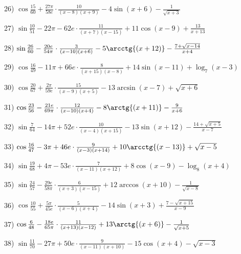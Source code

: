 \documentclass[11pt,ukrainian]{article}
\begin{document}
26) \space 
{ ${\cos\frac{15}{60}} + \frac{27{\pi}}{58 e}\cdot {\frac{10}{(x - 8)(x + 9)}} - {4\sin{(x + 6)}} - {\frac{1}{\sqrt{x + 3}}}$}
\smallskip\par
27) \space 
{ ${\sin\frac{10}{51}} - 22{\pi} - 62 e\cdot {\frac{11}{(x + 7)(x - 15)}} + {11\cos{(x - 9)}} + { \frac{13}{x + 13}}$}
\smallskip\par
28) \space 
{ ${\sin\frac{26}{60}} - \frac{20 e}{54{\pi}}\cdot {\frac{3}{(x - 10)(x + 6)}} - {5\arcctg{(x + 12)}} - {\frac{7 + \sqrt{x - 14}}{x + 4}}$}
\smallskip\par
29) \space 
{ ${\cos\frac{16}{49}} - 11{\pi} + 66 e\cdot {\frac{8}{(x + 15)(x - 8)}} + {14\sin{(x - 11)}} + {\log_{7}(x - 3)}$}
\smallskip\par
30) \space 
{ ${\cos\frac{20}{67}} + \frac{2{\pi}}{59 e}\cdot {\frac{15}{(x - 9)(x + 5)}} - {13\arcsin{(x - 7)}} + {\sqrt{x + 6}}$}
\smallskip\par
31) \space 
{ ${\cos\frac{23}{56}} - \frac{21 e}{69{\pi}}\cdot {\frac{12}{(x - 10)(x + 4)}} - {8\arctg{(x + 11)}} - { \frac{9}{x + 6}}$}
\smallskip\par
32) \space 
{ ${\sin\frac{7}{64}} - 14{\pi} + 52 e\cdot {\frac{10}{(x - 4)(x + 15)}} - {13\sin{(x + 12)}} - {\frac{14 + \sqrt{x + 5}}{x - 7}}$}
\smallskip\par
33) \space 
{ ${\cos\frac{16}{47}} - 3{\pi} + 46 e\cdot {\frac{9}{(x - 3)(x + 14)}} + {10\arcctg{(x - 13)}} + {\sqrt{x - 5}}$}
\smallskip\par
34) \space 
{ ${\sin\frac{19}{68}} + 4{\pi} - 53 e\cdot {\frac{7}{(x - 11)(x + 12)}} + {8\cos{(x - 9)}} - {\log_{8}(x + 4)}$}
\smallskip\par
35) \space 
{ ${\sin\frac{24}{57}} - \frac{29 e}{58{\pi}}\cdot {\frac{6}{(x + 3)(x - 15)}} + {12\arccos{(x + 10)}} - {\frac{1}{\sqrt{x - 8}}}$}
\smallskip\par
36) \space 
{ ${\cos\frac{10}{55}} + \frac{5{\pi}}{45 e}\cdot {\frac{5}{(x - 6)(x + 4)}} - {14\sin{(x + 3)}} + {\frac{7 - \sqrt{x + 15}}{x - 9}}$}
\smallskip\par
37) \space 
{ ${\cos\frac{6}{48}} - \frac{18 e}{65{\pi}}\cdot {\frac{11}{(x + 13)(x - 12)}} + {13\arctg{(x + 6)}} - {\frac{1}{\sqrt{x + 5}}}$}
\smallskip\par
38) \space 
{ ${\sin\frac{11}{70}} - 27{\pi} + 50 e\cdot {\frac{9}{(x - 11)(x + 10)}} - {15\cos{(x + 4)}} - {\sqrt{x - 3}}$}
\smallskip\par
\end{document}
